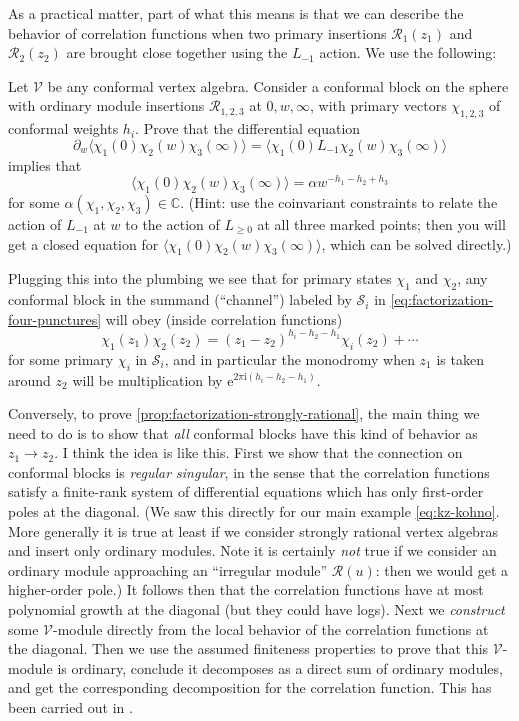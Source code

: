 \documentclass[12pt,letterpaper,reqno]{amsart}
\numberwithin{equation}{section}
\newcommand{\cS}{\ensuremath{\mathcal S}}
\newcommand{\bbC}{\ensuremath{\mathbb C}}
\newcommand{\I}{{\mathrm i}}
\newcommand{\e}{{\mathrm e}}
\newcommand{\vertex}{\mathcal{V}}
\newcommand{\vrep}{\mathcal{R}}
\newcommand{\IP}[1]{\langle#1\rangle}
\newcommand{\ti}[1]{\textit{#1}}
\DeclareRobustCommand{\fixme}[1]{\leavevmode{\color{orange}[#1]}}
\begin{document}
As a practical matter, part of what this means is that we can describe the
behavior of correlation functions when two primary insertions 
$\vrep_1(z_1)$ and $\vrep_2(z_2)$ are brought close together
using the $L_{-1}$ action. We use the following:
\begin{exercise}
Let $\vertex$ be any conformal vertex algebra.
Consider a conformal block on the sphere
with ordinary module insertions $\vrep_{1,2,3}$ at $0,w,\infty$,
with primary vectors $\chi_{1,2,3}$ of conformal weights $h_i$.
Prove that the differential equation
\begin{equation}
  \partial_w \IP{\chi_1(0) \chi_2(w) \chi_3(\infty)} = \IP{\chi_1(0) L_{-1} \chi_2(w) \chi_3(\infty)}
\end{equation}
implies that 
\begin{equation}
  \IP{\chi_1(0) \chi_2(w) \chi_3(\infty)} = \alpha w^{-h_1-h_2+h_3}
\end{equation}
for some $\alpha(\chi_1,\chi_2,\chi_3) \in \bbC$. (Hint: use the coinvariant constraints to 
relate the action of $L_{-1}$ at $w$ to the action of $L_{\ge 0}$
at all three marked points; then you will get a closed equation for
$\IP{\chi_1(0) \chi_2(w) \chi_3(\infty)}$, which can be solved directly.)
\end{exercise}

Plugging this into the plumbing we see that for 
primary states $\chi_1$ and $\chi_2$, any conformal block in the summand (``channel'') labeled by
$\cS_i$ in \eqref{eq:factorization-four-punctures} 
will obey (inside correlation functions)
\begin{equation}
  \chi_1(z_1) \chi_2(z_2) = (z_1 - z_2)^{h_i - h_2 - h_1} \chi_i(z_2)  + \cdots
\end{equation}
for some primary $\chi_i$ in $\cS_i$,
and in particular the monodromy when $z_1$ is taken around $z_2$ will be multiplication by
$\e^{2 \pi \I(h_i - h_2 - h_1)}$.

Conversely, to prove \autoref{prop:factorization-strongly-rational}, the main thing we need to 
do is to show that \ti{all} conformal blocks have this kind of
behavior as $z_1 \to z_2$. I think the idea is like this.
First we show that the connection on conformal blocks is \ti{regular singular},
in the sense that the correlation functions satisfy a finite-rank system of differential equations 
which has only first-order poles at the diagonal.
(We saw this directly for our main example \eqref{eq:kz-kohno}.
More generally it is true at least if we consider strongly rational vertex algebras
and insert only ordinary modules.
Note it is certainly \ti{not} true if we consider an ordinary module approaching an 
``irregular module'' $\vrep(u)$: then we would get a higher-order pole.)
It follows then that the correlation functions have at most polynomial growth
at the diagonal (but they could have logs).
Next we \ti{construct} some $\vertex$-module directly from the local behavior 
of the correlation functions at the diagonal. 
Then we use the assumed finiteness properties to 
prove that this $\vertex$-module is ordinary, conclude
it decomposes as a direct sum of ordinary modules, and get the corresponding decomposition 
for the correlation function.
This has been carried out in \fixme{...}.
\end{document}
